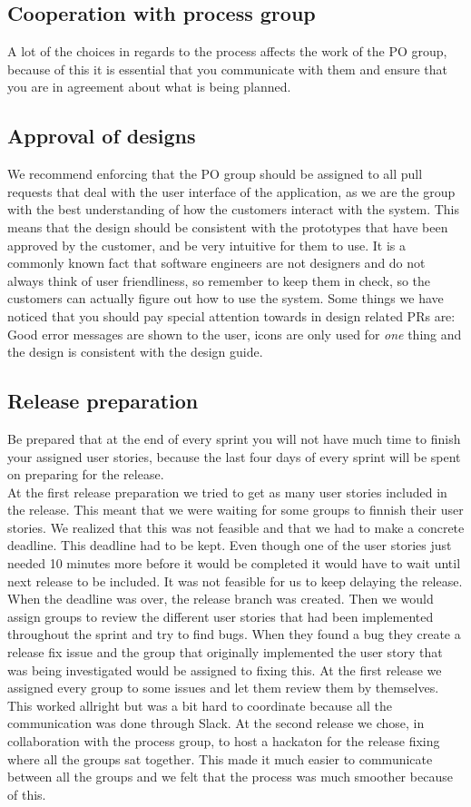 \subsection{Cooperation with process group}
A lot of the choices in regards to the process affects the work of the PO group, because of this it is essential that you communicate with them and ensure that you are in agreement about what is being planned.

\subsection{Approval of designs}
We recommend enforcing that the PO group should be assigned to all pull requests that deal with the user interface of the application, as we are the group with the best understanding of how the customers interact with the system.
This means that the design should be consistent with the prototypes that have been approved by the customer, and be very intuitive for them to use.
It is a commonly known fact that software engineers are not designers and do not always think of user friendliness, so remember to keep them in check, so the customers can actually figure out how to use the system.
Some things we have noticed that you should pay special attention towards in design related PRs are: Good error messages are shown to the user, icons are only used for \textit{one} thing and the design is consistent with the design guide.

\subsection{Release preparation}
Be prepared that at the end of every sprint you will not have much time to finish your assigned user stories, because the last four days of every sprint will be spent on preparing for the release.
\\
At the first release preparation we tried to get as many user stories included in the release. This meant that we were waiting for some groups to finnish their user stories. We realized that this was not feasible and that we had to make a concrete deadline. This deadline had to be kept. Even though one of the user stories just needed 10 minutes more before it would be completed it would have to wait until next release to be included. It was not feasible for us to keep delaying the release.
\\
When the deadline was over, the release branch was created. Then we would assign groups to review the different user stories that had been implemented throughout the sprint and try to find bugs. When they found a bug they create a release fix issue and the group that originally implemented the user story that was being investigated would be assigned to fixing this. At the first release we assigned every group to some issues and let them review them by themselves. This worked allright but was a bit hard to coordinate because all the communication was done through Slack. At the second release we chose, in collaboration with the process group, to host a hackaton for the release fixing where all the groups sat together. This made it much easier to communicate between all the groups and we felt that the process was much smoother because of this.

